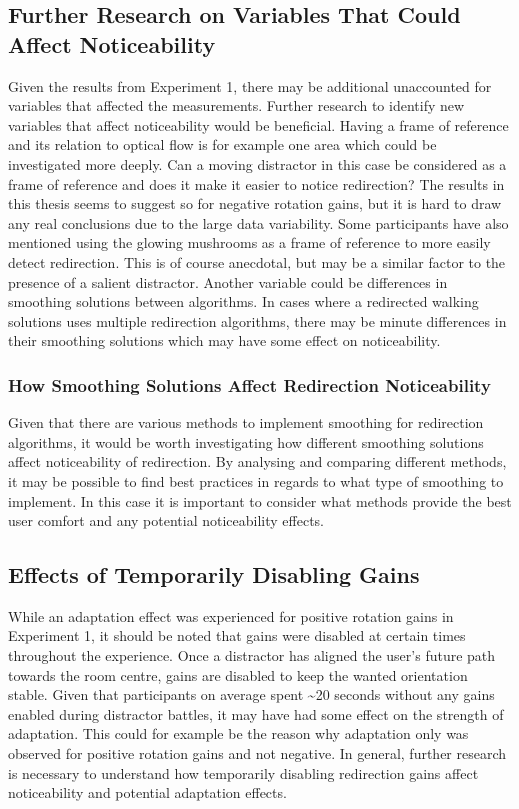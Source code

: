 \subsection{Further Research on Variables That Could Affect Noticeability}
Given the results from Experiment 1, there may be additional unaccounted for variables that affected the measurements. Further research to identify new variables that affect noticeability would be beneficial. Having a frame of reference and its relation to optical flow is for example one area which could be investigated more deeply. Can a moving distractor in this case be considered as a frame of reference and does it make it easier to notice redirection? The results in this thesis seems to suggest so for negative rotation gains, but it is hard to draw any real conclusions due to the large data variability. Some participants have also mentioned using the glowing mushrooms as a frame of reference to more easily detect redirection. This is of course anecdotal, but may be a similar factor to the presence of a salient distractor. Another variable could be differences in smoothing solutions between algorithms. In cases where a redirected walking solutions uses multiple redirection algorithms, there may be minute differences in their smoothing solutions which may have some effect on noticeability. 

\subsubsection{How Smoothing Solutions Affect Redirection Noticeability} 
Given that there are various methods to implement smoothing for redirection algorithms, it would be worth investigating how different smoothing solutions affect noticeability of redirection. By analysing and comparing different methods, it may be possible to find best practices in regards to what type of smoothing to implement. In this case it is important to consider what methods provide the best user comfort and any potential noticeability effects. 

\subsection{Effects of Temporarily Disabling Gains}
While an adaptation effect was experienced for positive rotation gains in Experiment 1, it should be noted that gains were disabled at certain times throughout the experience. Once a distractor has aligned the user's future path towards the room centre, gains are disabled to keep the wanted orientation stable. Given that participants on average spent \textasciitilde20 seconds without any gains enabled during distractor battles, it may have had some effect on the strength of adaptation. This could for example be the reason why adaptation only was observed for positive rotation gains and not negative. In general, further research is necessary to understand how temporarily disabling redirection gains affect noticeability and potential adaptation effects.

